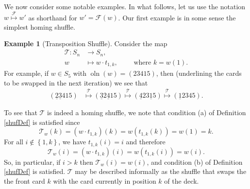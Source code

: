 \documentclass[final,nomarks]{dmtcs-episciences}
\theoremstyle{definition}
\theoremstyle{definition}
\newtheorem{exmp}[thm]{Example}
\theoremstyle{remark}
\newcommand{\f}{\mathcal{F}} %
\newcommand{\T}{\mathcal{T}} %
\newcommand{\Tw}{\mathcal{T}_w} %
\newcommand{\xmto}[1]{\overset{ #1 }{ \mapsto }}
\newcommand{\tup}[1]{\left( #1 \right)}
\newcommand{\set}[1]{\left\{ #1 \right\}}
\newcommand{\oln}{\operatorname{oln}}
\begin{document}
We now consider some notable examples. In what follows, let us use the notation $w \overset{\f}{ \mapsto } w'$ as shorthand for $w' = \f(w)$. Our first example is in some sense the simplest homing shuffle.

\begin{exmp}[Transposition Shuffle]
    \label{examp1}
   Consider the map
   \begin{align*}
       \T : S_{n} &\to S_{n}, \\
       w &\mapsto w \cdot t_{1, k}, %
       \qquad \text{ where } k = w\tup{1}.
   \end{align*}
   For example, if $ w \in S_{5} $ with $ \oln\tup{w} = \tup{2 3 4 1 5} $, then (underlining the cards to be swapped in the next iteration) we see that
   \begin{align*}
        \tup{\underline{2} \underline{3} 4 1 5} &\xmto{\T} \tup{\underline{3} 2 \underline{4} 1 5} \xmto{\T} \tup{\underline{4} 2 3 \underline{1} 5} \xmto{\T} \tup{\underline{1} 2 3 4 5} .
   \end{align*}
   
   To see that $\T$ is indeed a homing shuffle, we note that condition (a) of Definition \ref{shufDef} is satisfied since
   \[
       \Tw\tup{ k } = \tup{w \cdot t_{1,k}} \tup{ k } = w\tup{t_{1,k}\tup{k}} = w\tup{1} = k .
   \]
   For all $ i \not\in \set{1, k} $, we have $t_{1,k}\tup{i} = i$ and therefore
   \[
       \Tw\tup{ i } = \tup{w \cdot t_{1,k}}\tup{ i } = w\tup{t_{1,k}\tup{i}}  = w\tup{ i } .
   \]
   So, in particular, if $ i > k $ then $  \T_w\tup{ i } = w\tup{ i } $, and condition (b) of Definition \ref{shufDef} is satisfied. $\T$ may be described informally as the shuffle that swaps the the front card $k$ with the card currently in position $k$ of the deck. 
\end{exmp}
\end{document}

